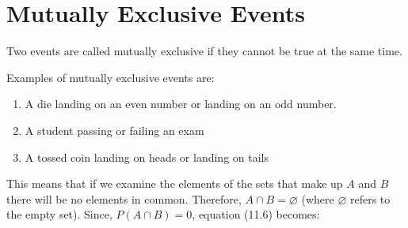             \section{ Mutually Exclusive Events}
            \nopagebreak
            \label{m39377*id114732}Two events are called mutually exclusive if they cannot be
true at the same time.\par 
      \label{m39377*id114736}Examples of mutually exclusive events are:\par 
      \label{m39377*id114740}\begin{enumerate}[noitemsep, label=\textbf{\arabic*}. ] 
            \label{m39377*uid76}\item A die landing on an even number or landing on an odd
number.
\label{m39377*uid77}\item A student passing or failing an exam
\label{m39377*uid78}\item A tossed coin landing on heads or landing on tails
\end{enumerate}
      \label{m39377*id114782}This means that if we examine the elements of the sets
that make up $A$ and $B$ there will be no elements in common.
Therefore, $A\cap B=\varnothing $ (where $\varnothing $ refers to the empty set). Since,
$P\left(A\cap B\right)=0$,
equation (11.6) becomes:\par 
      \label{m39377*id114861}\nopagebreak\noindent{}
        
